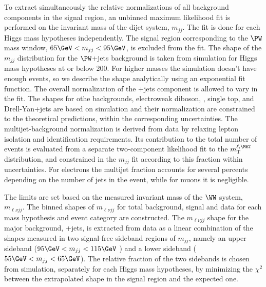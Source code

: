 
To extract simultaneously the relative normalizations of all
background components in the signal region, an unbinned maximum
likelihood fit is performed on the invariant mass of the dijet system,
$m_{jj}$.  The fit is done for each Higgs mass hypotheses
independently.  The signal region corresponding to the $\PW$ mass window,
$65\GeV < m_{jj} < 95\GeV$, is excluded from the fit.  The shape of the $m_{jj}$ 
distribution for the $\PW$+jets background
is taken from simulation for Higgs mass hypotheses at or below
200\GeV. For higher masses the simulation doesn't have enough events,
so we describe the shape analytically using an exponential fit
function.  The overall normalization of the \PW+jets component is
allowed to vary in the fit.  The shapes for othe backgrounds,
electroweak diboson, \ttbar, single
top, and Drell-Yan+jets are based on simulation and their
normalization are constrained to the theoretical predictions, within
the corresponding uncertainties.
The multijet-background normalization is derived from data by relaxing
lepton isolation and identification requirements. Its contribution to
the total number of events is evaluated from a separate two-component
likelihood fit to the $m_{\rm{T}}^{\ell,\MET}$ distribution, and constrained
in the $m_{jj}$ fit according to this fraction within
uncertainties. 
For electrons the multijet fraction accounts for several percents depending on the number 
of jets
in the event, while for
muons it is negligible.

The limits are set based on the measured invariant mass of the $\WW$
system, 
$m_{\ell\nu jj}$.  The binned shapes of $m_{\ell\nu jj}$ for total
background, signal and data for each mass hypothesis and event
category are constructed.
The $m_{\ell\nu jj}$ shape for the major background,  
\PW+jets,
is
extracted from data as a linear combination of the shapes measured in
two signal-free sideband regions of $m_{jj}$, namely an upper sideband
($95\GeV <m_{jj} < 115\GeV$ ) and a lower sideband ($55\GeV <m_{jj} <
65\GeV$).  The relative fraction of the two sidebands is chosen from
simulation, separately for each Higgs mass hypotheses, by
minimizing the $\chi^2$ between the extrapolated shape in the signal
region and the expected one.

